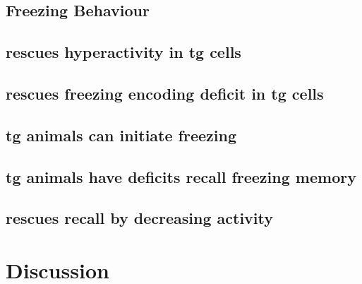 \subsection{Freezing Behaviour}
\subsection{\tglu rescues hyperactivity in \gls{tg} cells}
\subsection{\tglu rescues freezing encoding deficit in \gls{tg} cells}
\subsection{\Gls{tg} animals can initiate freezing}
\subsection{\Gls{tg} animals have deficits recall freezing memory}
\subsection{\tglu rescues recall by decreasing activity}

\section{Discussion}
